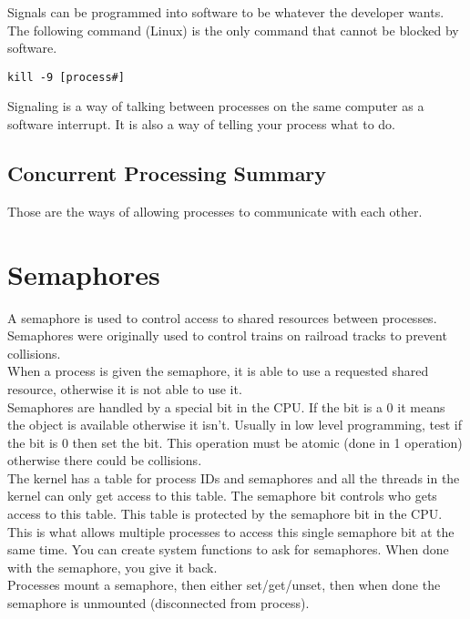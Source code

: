 \documentclass{report}
\begin{document}
\noindent
Signals can be programmed into software to be whatever the developer wants. The following command (Linux) is the only command that cannot be blocked by software.
\begin{verbatim}
kill -9 [process#]
\end{verbatim}

\noindent
Signaling is a way of talking between processes on the same computer as a software interrupt. It is also a way of telling your process what to do.

\subsection{Concurrent Processing Summary}
Those are the ways of allowing processes to communicate with each other.

\section{Semaphores}
A semaphore is used to control access to shared resources between processes.\\

Semaphores were originally used to control trains on railroad tracks to prevent collisions.\\

When a process is given the semaphore, it is able to use a requested shared resource, otherwise it is not able to use it.\\

Semaphores are handled by a special bit in the CPU. If the bit is a 0 it means the object is available otherwise it isn't. Usually in low level programming, test if the bit is 0 then set the bit. This operation must be atomic (done in 1 operation) otherwise there could be collisions.\\

The kernel has a table for process IDs and semaphores and all the threads in the kernel can only get access to this table. The semaphore bit controls who gets access to this table. This table is protected by the semaphore bit in the CPU. This is what allows multiple processes to access this single semaphore bit at the same time. You can create system functions to ask for semaphores. When done with the semaphore, you give it back.\\

Processes mount a semaphore, then either set/get/unset, then when done the semaphore is unmounted (disconnected from process).\\
\end{document}
